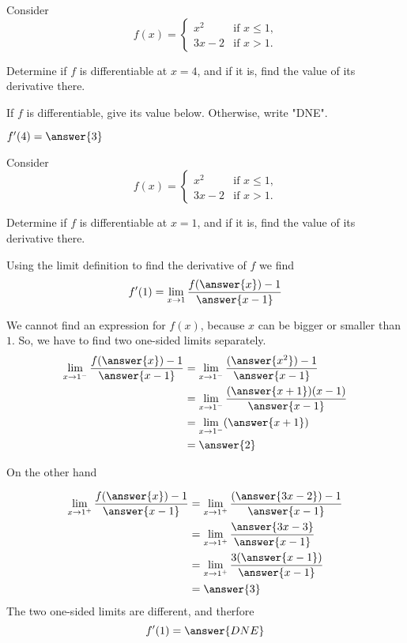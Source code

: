 \documentclass{ximera}
\author{Steven Gubkin \and Nela Lakos}
\begin{document}
\begin{exercise}

Consider 
\[
f(x) = \begin{cases} 
	x^2 &\text{if $x \leq 1$,}\\
	 3x-2 &\text{if  $x > 1$.}
\end{cases}
\]


Determine if $f$ is differentiable at $x=4$, and if it is, find the value of its derivative there.

\begin{prompt}
	If $f$ is differentiable, give its value below.  Otherwise, write "DNE".
	
	$f'(4) = \answer{3}$
\end{prompt}

\end{exercise}
\begin{exercise}

Consider 
\[
f(x) = \begin{cases} 
	x^2 &\text{if $x \leq 1$,}\\
	 3x-2 &\text{if  $x > 1$.}
\end{cases}
\]


Determine if $f$ is differentiable at $x=1$, and if it is, find the value of its derivative there.

Using the limit definition to find the derivative of $f$ we find
\[
f'(1)= \lim_{x\to1}\frac{f(\answer{x})-1}{\answer{x-1}}\\
\]

We cannot find an expression for $f(x)$, because $x$ can be bigger or smaller than $1$.
So, we have to find two one-sided limits separately.
\begin{align*}
 \lim_{x\to1^{-}}\frac{f(\answer{x})-1}{\answer{x-1}}&= \lim_{x\to1^{-}}\frac{(\answer{x^2})-1}{\answer{x-1}}\\
 &= \lim_{x\to1^{-}}\frac{(\answer{x+1})(x-1)}{\answer{x-1}}\\
  &= \lim_{x\to1^{-}}(\answer{x+1})\\
  &=\answer{2}
       \end{align*}

On the other hand


\begin{align*}
 \lim_{x\to1^{+}}\frac{f(\answer{x})-1}{\answer{x-1}}&= \lim_{x\to1^{+}}\frac{(\answer{3x-2})-1}{\answer{x-1}}\\
 &=\lim_{x\to1^{+}}\frac{\answer{3x-3}}{\answer{x-1}}\\
 &=\lim_{x\to1^{+}}\frac{3(\answer{x-1})}{\answer{x-1}}\\
  &=\answer{3}
       \end{align*}
The two one-sided limits are different, and therfore
\[
f'(1)= {\answer{DNE}}\\
\]

\end{exercise}
\end{document}
